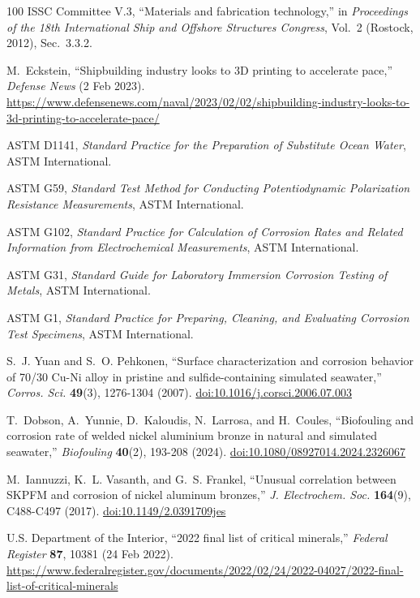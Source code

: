 \documentclass[12pt,letterpaper]{article}
\begin{document}
\begin{thebibliography}{100}
ISSC Committee V.3, ``Materials and fabrication technology,'' in \emph{Proceedings of the 18th International Ship and Offshore Structures Congress}, Vol.~2 (Rostock, 2012), Sec.~3.3.2.

M.~Eckstein, ``Shipbuilding industry looks to 3D printing to accelerate pace,'' \emph{Defense News} (2 Feb 2023).
\url{https://www.defensenews.com/naval/2023/02/02/shipbuilding-industry-looks-to-3d-printing-to-accelerate-pace/}

ASTM D1141, \emph{Standard Practice for the Preparation of Substitute Ocean Water}, ASTM International.

ASTM G59, \emph{Standard Test Method for Conducting Potentiodynamic Polarization Resistance Measurements}, ASTM International.

ASTM G102, \emph{Standard Practice for Calculation of Corrosion Rates and Related Information from Electrochemical Measurements}, ASTM International.

ASTM G31, \emph{Standard Guide for Laboratory Immersion Corrosion Testing of Metals}, ASTM International.

ASTM G1, \emph{Standard Practice for Preparing, Cleaning, and Evaluating Corrosion Test Specimens}, ASTM International.

S.~J. Yuan and S.~O. Pehkonen, ``Surface characterization and corrosion behavior of 70/30 Cu-Ni alloy in pristine and sulfide-containing simulated seawater,'' \emph{Corros. Sci.} \textbf{49}(3), 1276-1304 (2007).
\href{https://doi.org/10.1016/j.corsci.2006.07.003}{doi:10.1016/j.corsci.2006.07.003}

T.~Dobson, A.~Yunnie, D.~Kaloudis, N.~Larrosa, and H.~Coules, ``Biofouling and corrosion rate of welded nickel aluminium bronze in natural and simulated seawater,'' \emph{Biofouling} \textbf{40}(2), 193-208 (2024).
\href{https://doi.org/10.1080/08927014.2024.2326067}{doi:10.1080/08927014.2024.2326067}

M.~Iannuzzi, K.~L. Vasanth, and G.~S. Frankel, ``Unusual correlation between SKPFM and corrosion of nickel aluminum bronzes,'' \emph{J. Electrochem. Soc.} \textbf{164}(9), C488-C497 (2017).
\href{https://doi.org/10.1149/2.0391709jes}{doi:10.1149/2.0391709jes}

U.S. Department of the Interior, ``2022 final list of critical minerals,'' \emph{Federal Register} \textbf{87}, 10381 (24 Feb 2022).
\url{https://www.federalregister.gov/documents/2022/02/24/2022-04027/2022-final-list-of-critical-minerals}


\end{thebibliography}
\end{document}
